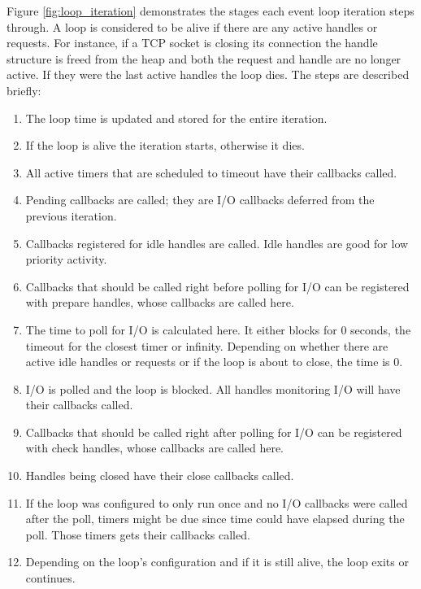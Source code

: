 Figure \ref{fig:loop_iteration} demonstrates the stages each event loop
iteration steps through. A loop is considered to be alive if there are any
active handles or requests. For instance, if a TCP socket is closing its
connection the handle structure is freed from the heap and both the request and
handle are no longer active. If they were the last active handles the loop
dies. The steps are described briefly: \cite{libuv-docs}

\begin{enumerate}

    \item The loop time is updated and stored for the entire iteration.

    \item If the loop is alive the iteration starts, otherwise it dies.

    \item All active timers that are scheduled to timeout have their callbacks
        called.

    \item Pending callbacks are called; they are I/O callbacks deferred from
        the previous iteration.

    \item Callbacks registered for idle handles are called. Idle handles are
        good for low priority activity.

    \item Callbacks that should be called right before polling for I/O can be
        registered with prepare handles, whose callbacks are called here.

    \item The time to poll for I/O is calculated here. It either blocks for 0
        seconds, the timeout for the closest timer or infinity. Depending on
        whether there are active idle handles or requests or if the loop is
        about to close, the time is 0. \label{item:poll_time_calculation}

    \item I/O is polled and the loop is blocked. All handles monitoring I/O
        will have their callbacks called.

    \item Callbacks that should be called right after polling for I/O can be
        registered with check handles, whose callbacks are called here.

    \item Handles being closed have their close callbacks called.

    \item If the loop was configured to only run once and no I/O callbacks were
        called after the poll, timers might be due since time could have
        elapsed during the poll. Those timers gets their callbacks called.

    \item Depending on the loop's configuration and if it is still alive, the
        loop exits or continues.

\end{enumerate}

